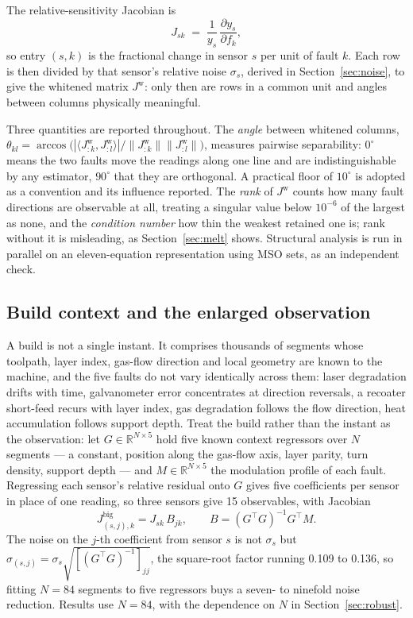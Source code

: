 \documentclass[preprint,times]{elsarticle}
\begin{document}
The relative-sensitivity Jacobian is
%
\begin{equation}
J_{sk} \;=\; \frac{1}{y_s}\,\frac{\partial y_s}{\partial f_k},
\label{eq:jac}
\end{equation}
%
so entry $(s,k)$ is the fractional change in sensor $s$ per unit of fault $k$.
Each row is then
divided by that sensor's relative noise $\sigma_s$, derived in
Section~\ref{sec:noise}, to give the whitened matrix $J^{\mathrm{w}}$: only then
are rows in a common unit and angles between columns physically meaningful.

Three quantities are reported throughout. The \emph{angle} between whitened
columns, $\theta_{kl} = \arccos\big(|\langle J^{\mathrm{w}}_{:k},
J^{\mathrm{w}}_{:l}\rangle| / \|J^{\mathrm{w}}_{:k}\|
\|J^{\mathrm{w}}_{:l}\|\big)$, measures pairwise separability: $0^\circ$ means
the two faults move the readings along one line and are indistinguishable by any
estimator, $90^\circ$ that they are orthogonal. A practical floor of $10^\circ$
is adopted as a convention and its influence reported. The \emph{rank} of
$J^{\mathrm{w}}$ counts how many fault directions are observable at all, treating
a singular value below $10^{-6}$ of the largest as none, and the \emph{condition
number} how thin the weakest retained one is; rank without it is misleading, as
Section~\ref{sec:melt} shows. Structural analysis is run in parallel on an
eleven-equation representation using MSO sets, as an independent check.

\subsection{Build context and the enlarged observation}
\label{sec:context}

A build is not a single instant. It comprises thousands of segments whose
toolpath, layer index, gas-flow direction and local geometry are known to the
machine, and the five faults do not vary identically across them: laser
degradation drifts with time, galvanometer error concentrates at direction
reversals, a recoater short-feed recurs with layer index, gas degradation follows
the flow direction, heat accumulation follows support depth. Treat the build
rather than the instant as the observation: let $G\in\mathbb{R}^{N\times 5}$ hold
five known context regressors over $N$ segments --- a constant, position along
the gas-flow axis, layer parity, turn density, support depth --- and
$M\in\mathbb{R}^{N\times 5}$ the modulation profile of each fault. Regressing
each sensor's relative residual onto $G$ gives five coefficients per sensor in
place of one reading, so three sensors give 15 observables, with Jacobian
%
\begin{equation}
J^{\mathrm{big}}_{(s,j),k} = J_{sk}\,B_{jk},
\qquad B = (G^{\!\top}G)^{-1}G^{\!\top}M .
\label{eq:big}
\end{equation}
%
The noise on the $j$-th coefficient from sensor $s$ is not $\sigma_s$ but
$\sigma_{(s,j)} = \sigma_s\sqrt{[(G^{\!\top}G)^{-1}]_{jj}}$, the square-root
factor running 0.109 to 0.136, so fitting $N=84$ segments to five regressors
buys a seven- to ninefold noise reduction. Results use $N=84$, with the dependence on $N$ in
Section~\ref{sec:robust}.
\end{document}

